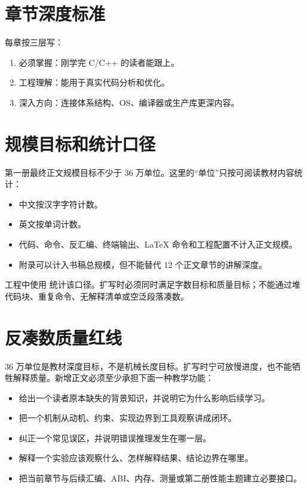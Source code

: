 \section*{章节深度标准}

每章按三层写：

\begin{enumerate}
  \item 必须掌握：刚学完 C/C++ 的读者能跟上。
  \item 工程理解：能用于真实代码分析和优化。
  \item 深入方向：连接体系结构、OS、编译器或生产库更深内容。
\end{enumerate}

\section*{规模目标和统计口径}

第一册最终正文规模目标不少于 36 万单位。这里的“单位”只按可阅读教材内容统计：

\begin{itemize}
  \item 中文按汉字字符计数。
  \item 英文按单词计数。
  \item 代码、命令、反汇编、终端输出、LaTeX 命令和工程配置不计入正文规模。
  \item 附录可以计入书稿总规模，但不能替代 12 个正文章节的讲解深度。
\end{itemize}

工程中使用  统计该口径。扩写时必须同时满足字数目标和质量目标；不能通过堆代码块、重复命令、无解释清单或空泛段落凑数。

\section*{反凑数质量红线}

36 万单位是教材深度目标，不是机械长度目标。扩写时宁可放慢进度，也不能牺牲解释质量。新增正文必须至少承担下面一种教学功能：

\begin{itemize}
  \item 给出一个读者原本缺失的背景知识，并说明它为什么影响后续学习。
  \item 把一个机制从动机、约束、实现边界到工具观察讲成闭环。
  \item 纠正一个常见误区，并说明错误推理发生在哪一层。
  \item 解释一个实验应该观察什么、怎样解释结果、结论边界在哪里。
  \item 把当前章节与后续汇编、ABI、内存、测量或第二册性能主题建立必要接口。
\end{itemize}

